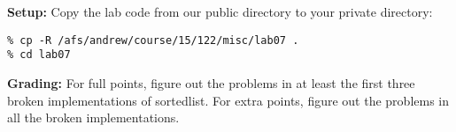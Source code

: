 \documentclass[lab]{inc/122handout}
\begin{document}
\labcollab

\textbf{Setup:} Copy the lab code from our public directory to your private
directory:

\begin{lstlisting}[language={[coin]C}]
% cd private/15122
% cp -R /afs/andrew/course/15/122/misc/lab07 .
% cd lab07
\end{lstlisting}

\textbf{Grading:} For full points, figure out the problems in at least the
first three broken implementations of sortedlist. For extra points, figure out
the problems in all the broken implementations.

\end{document}
